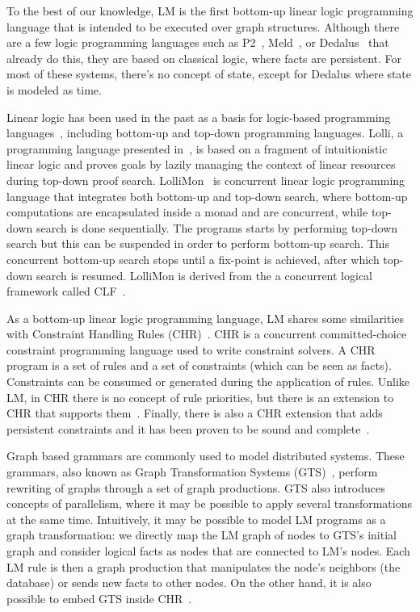 
To the best of our knowledge, LM is the first bottom-up linear logic programming language
that is intended to be executed over graph structures. Although there are a few logic programming languages such as P2~\cite{Loo-condie-garofalakis-p2},
Meld~\cite{ashley-rollman-iclp09}, or Dedalus~\cite{Alvaro:EECS-2009-173} that already do this, they are based on classical logic, where facts are persistent. For most of these systems, there's no concept of state, except for Dedalus where state is modeled as time.

Linear logic has been used in the past as a basis for logic-based programming languages~\cite{Miller85anoverview}, including bottom-up and top-down programming languages. Lolli, a programming language presented in~\cite{Hodas94logicprogramming}, is based on a fragment of intuitionistic linear logic
and proves goals by lazily managing the context of linear resources during top-down proof search. LolliMon~\cite{Lopez:2005:MCL:1069774.1069778} is concurrent linear logic programming language that integrates both bottom-up and top-down search, where bottom-up computations are encapsulated inside a monad and are concurrent, while top-down search is done sequentially. The programs starts by performing top-down search but this can be suspended in order to perform bottom-up search. This concurrent bottom-up search stops until a fix-point is achieved, after which top-down search is resumed. LolliMon is derived from the a concurrent logical framework called CLF~\cite{Watkins:2004uq,Cervesato02aconcurrent,Watkins03aconcurrent}.

As a bottom-up linear logic programming language, LM shares some similarities with Constraint Handling Rules (CHR)~\cite{Betz:2005kx,Betz:2013:LBA:2422085.2422086}.
CHR is a concurrent committed-choice constraint programming language used to write constraint solvers. A CHR program is a set of rules and
a set of constraints (which can be seen as facts). Constraints can be consumed or generated during the application of rules.
Unlike LM, in CHR there is no
concept of rule priorities, but there is an extension to CHR that supports them~\cite{DeKoninck:2007:URP:1273920.1273924}.
Finally, there is also a CHR extension that adds persistent constraints and it has been proven to be sound and complete~\cite{DBLP:journals/corr/abs-1007-3829}.

Graph based grammars are commonly used to model distributed systems. These grammars, also known as Graph Transformation Systems (GTS)~\cite{Ehrig:2004vn},
perform rewriting of graphs through a set of graph productions. GTS also introduces
concepts of parallelism, where it may be possible to apply several transformations at the same time. Intuitively, it may be possible to model
LM programs as a graph transformation: we directly map the LM graph of nodes to GTS's initial graph and consider logical facts as nodes that are connected
to LM's nodes. Each LM rule is then a graph production that manipulates the node's neighbors (the database) or sends new facts to other nodes.
On the other hand, it is also possible to embed GTS inside CHR~\cite{Raiser:2011:AGT:1972935.1972938}.
